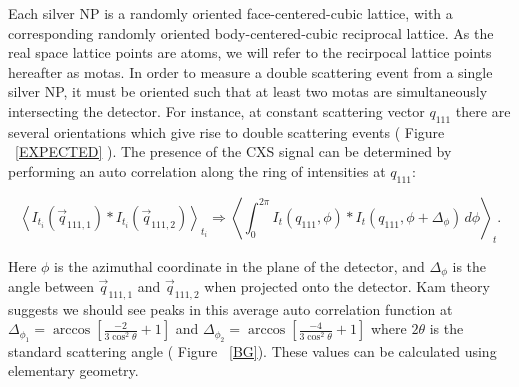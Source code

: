 \documentclass[a4paper,12pt]{article}
\begin{document}
Each silver NP is a randomly oriented face-centered-cubic lattice, with a corresponding randomly oriented body-centered-cubic reciprocal lattice. As the real space lattice points are atoms, we will refer to the recirpocal lattice points hereafter as motas. In order to measure a double scattering event from a single silver NP, it must be oriented such that at least two motas are simultaneously intersecting the detector. For instance, at constant scattering vector $q_{111}$ there are several orientations which give rise to double scattering events ( Figure ~\ref{EXPECTED} ). The presence of the CXS signal can be determined by performing an auto correlation along the ring of intensities at $q_{111}$:

\begin{equation} \label{COR}
\left \langle I_{t_{i}}( \vec{q}_{111,1}) * I_{t_{i}}(\vec{q}_{111,2}) \right \rangle_{t_{i}} \Rightarrow \left \langle \int_{0}^{2\pi} I_{t} ( q_{111},\phi ) * I_{t} (q_{111},\phi +\Delta_{\phi} )\, d\phi \right \rangle_{t}.
\end{equation}

\noindent Here $\phi$ is the azimuthal coordinate in the plane of the detector, and $\Delta_{\phi}$ is the angle between $\vec{q}_{111,1}$ and $\vec{q}_{111,2}$ when projected onto the detector. Kam theory suggests we should see peaks in this average auto correlation function at $\Delta_{\phi _{1}} = \arccos[ \frac{-2}{3\cos^{2}\theta} + 1  ]$ and $\Delta_{\phi _{2}} = \arccos[ \frac{-4}{3\cos^{2}\theta} + 1  ]$ where $2\theta$ is the standard scattering angle ( Figure ~\ref{BG}). These values can be calculated using elementary geometry.
\end{document}
